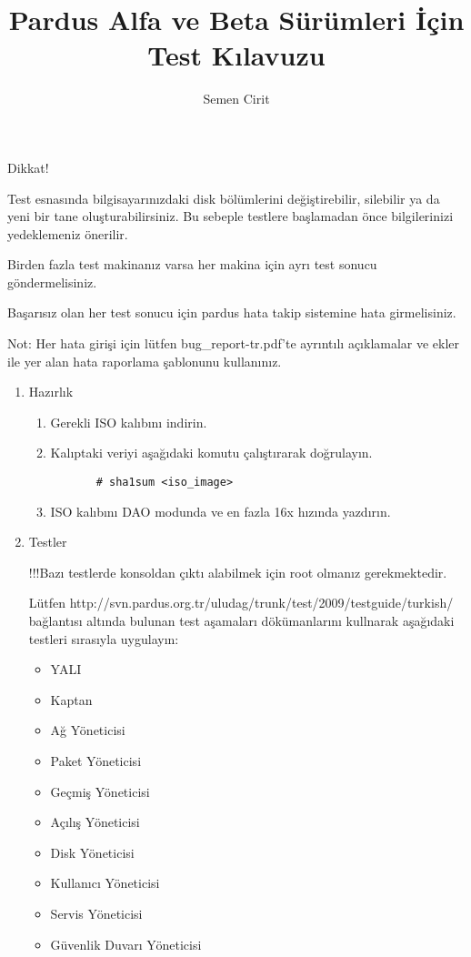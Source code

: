\documentclass[a4paper,10pt]{article}
\title{Pardus Alfa ve Beta Sürümleri İçin Test Kılavuzu}
\author{Semen Cirit}
\begin{document}
\maketitle

Dikkat!

    Test esnasında bilgisayarınızdaki disk bölümlerini değiştirebilir, silebilir ya da yeni bir tane oluşturabilirsiniz. Bu sebeple testlere başlamadan önce bilgilerinizi yedeklemeniz önerilir.
    
    Birden fazla test makinanız varsa her makina için ayrı test sonucu göndermelisiniz.

    Başarısız olan her test sonucu için pardus hata takip sistemine hata girmelisiniz.

    Not: Her hata girişi için lütfen bug\_report-tr.pdf'te ayrıntılı açıklamalar ve ekler ile yer alan hata raporlama şablonunu kullanınız.

\begin{enumerate}
\item Hazırlık
  \begin{enumerate}
    \item Gerekli ISO kalıbını indirin.
    \item Kalıptaki veriyi aşağıdaki komutu çalıştırarak doğrulayın.
      \begin{verbatim}
       # sha1sum <iso_image>
      \end{verbatim}
    \item ISO kalıbını DAO modunda ve en fazla 16x hızında yazdırın.
  \end{enumerate}
  \item Testler
    
 	!!!Bazı testlerde konsoldan çıktı alabilmek için root olmanız gerekmektedir.
	
    Lütfen http://svn.pardus.org.tr/uludag/trunk/test/2009/testguide/turkish/ bağlantısı altında bulunan test aşamaları dökümanlarını kullnarak aşağıdaki testleri sırasıyla uygulayın:
    \begin{itemize}
    \item YALI
    \item Kaptan
    \item Ağ Yöneticisi
    \item Paket Yöneticisi
    \item Geçmiş Yöneticisi
    \item Açılış Yöneticisi
    \item Disk Yöneticisi
    \item Kullanıcı Yöneticisi
    \item Servis Yöneticisi
    \item Güvenlik Duvarı Yöneticisi
    \end{itemize}
 \end{enumerate}
\end{document}
